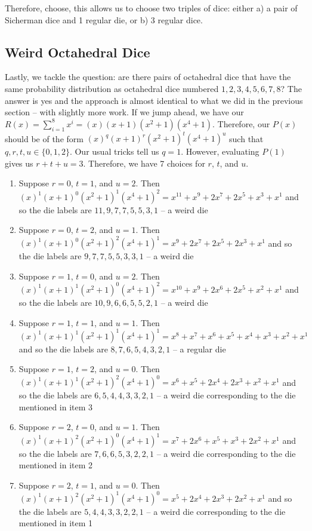 \documentclass[12pt]{report}
\begin{document}
Therefore, choose, this allows us to choose two triples of dice: either a) a pair of Sicherman dice and 1 regular die, or b) 3 regular dice. 

\subsection*{Weird Octahedral Dice}
Lastly, we tackle the question: are there pairs of octahedral dice that have the same probability distribution as octahedral dice numbered $1,2,3,4,5,6,7,8$? The answer is yes and the approach is almost identical to what we did in the previous section -- with slightly more work. If we jump ahead, we have our $R(x)=\sum_{i=1}^{8} x^{i}=(x)(x+1)(x^{2}+1)(x^{4}+1)$. Therefore, our $P(x)$ should be of the form $(x)^{q}(x+1)^{r}(x^{2}+1)^{t}(x^{4}+1)^{u}$ such that $q,r,t,u \in \{0,1,2\}$. Our usual tricks tell us $q=1$. However, evaluating $P(1)$ gives us $r+t+u=3$. Therefore, we have 7 choices for $r$, $t$, and $u$.

\begin{enumerate}
\item Suppose $r=0$, $t=1$, and $u=2$. Then $(x)^{1}(x+1)^{0}(x^{2}+1)^{1}(x^{4}+1)^{2}=x^{11}+x^{9}+2x^{7}+2x^{5}+x^{3}+x^{1}$ and so the die labels are $11,9,7,7,5,5,3,1$ -- a weird die
\item Suppose $r=0$, $t=2$, and $u=1$. Then $(x)^{1}(x+1)^{0}(x^{2}+1)^{2}(x^{4}+1)^{1}=x^{9}+2x^{7}+2x^{5}+2x^{3}+x^{1}$ and so the die labels are $9,7,7,5,5,3,3,1$ -- a weird die
\item Suppose $r=1$, $t=0$, and $u=2$. Then $(x)^{1}(x+1)^{1}(x^{2}+1)^{0}(x^{4}+1)^{2}=x^{10}+x^{9}+2x^{6}+2x^{5}+x^{2}+x^{1}$ and so the die labels are $10,9,6,6,5,5,2,1$ -- a weird die
\item Suppose $r=1$, $t=1$, and $u=1$. Then $(x)^{1}(x+1)^{1}(x^{2}+1)^{1}(x^{4}+1)^{1}=x^{8}+x^{7}+x^{6}+x^{5}+x^{4}+x^{3}+x^{2}+x^{1}$ and so the die labels are $8,7,6,5,4,3,2,1$ -- a regular die 
\item Suppose $r=1$, $t=2$, and $u=0$. Then $(x)^{1}(x+1)^{1}(x^{2}+1)^{2}(x^{4}+1)^{0}=x^{6}+x^{5}+2x^{4}+2x^{3}+x^{2}+x^{1}$ and so the die labels are $6,5,4,4,3,3,2,1$ -- a weird die corresponding to the die mentioned in item 3
\item Suppose $r=2$, $t=0$, and $u=1$. Then $(x)^{1}(x+1)^{2}(x^{2}+1)^{0}(x^{4}+1)^{1}=x^{7}+2x^{6}+x^{5}+x^{3}+2x^{2}+x^{1}$ and so the die labels are $7,6,6,5,3,2,2,1$ -- a weird die corresponding to the die mentioned in item 2
\item Suppose $r=2$, $t=1$, and $u=0$. Then $(x)^{1}(x+1)^{2}(x^{2}+1)^{1}(x^{4}+1)^{0}=x^{5}+2x^{4}+2x^{3}+2x^{2}+x^{1}$ and so the die labels are $5,4,4,3,3,2,2,1$ -- a weird die corresponding to the die mentioned in item 1
\end{enumerate}
\end{document}

